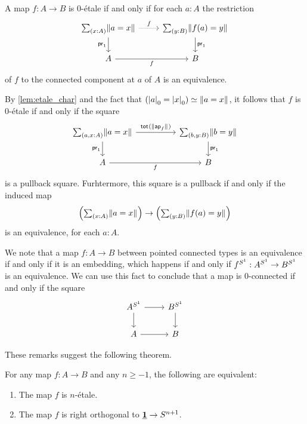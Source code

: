 \documentclass[9pt,twosided]{amsart}
\begin{document}
\begin{rmk}
A map $f:A\to B$ is $0$-\'etale if and only if for each $a:A$ the restriction
\begin{equation*}
\begin{tikzcd}
\sm{x:A}\brck{a=x} \arrow[d,swap,"\proj 1"] \arrow[r,densely dotted,"f"] & \sm{y:B}\brck{f(a)=y} \arrow[d,"\proj 1"] \\
A \arrow[r,swap,"f"] & B
\end{tikzcd}
\end{equation*}
of $f$ to the connected component at $a$ of $A$ is an equivalence.

By \cref{lem:etale_char} and the fact that $\eqv{(\tproj{0}{a}=\tproj{0}{x})}{\brck{a=x}}$, it follows that $f$ is $0$-\'etale if and only if the square
\begin{equation*}
\begin{tikzcd}[column sep=huge]
\sm{a,x:A}\brck{a=x} \arrow[d,swap,"\proj 1"] \arrow[r,"\total{\brck{\apfunc{f}}}"] & \sm{b,y:B}\brck{b=y} \arrow[d,"\proj 1"] \\
A \arrow[r,swap,"f"] & B
\end{tikzcd}
\end{equation*}
is a pullback square. Furhtermore, this square is a pullback if and only if the induced map
\begin{equation*}
\Big(\sm{x:A}\brck{a=x}\Big)\to\Big(\sm{y:B}\brck{f(a)=y}\Big)
\end{equation*}
is an equivalence, for each $a:A$.

We note that a map $f:A\to B$ between pointed connected types is an equivalence if and only if it is an embedding, which happens if and only if $f^{S^{1}}:A^{S^{1}} \to B^{S^{1}}$ is an equivalence. We can use this fact to conclude that a map is $0$-connected if and only if the square
    \begin{equation*}
      \begin{tikzcd}
        A^{\sphere{1}} \arrow[r] \arrow[d] & B^{\sphere{1}} \arrow[d] \\
        A \arrow[r] & B
      \end{tikzcd}
    \end{equation*}
\end{rmk}

These remarks suggest the following theorem.

\begin{thm}
  \label{thm:char_n_etale}
  For any map $f:A\to B$ and any $n\geq -1$, the following are equivalent:
  \begin{enumerate}
  \item The map $f$ is $n$-\'etale.
  \item The map $f$ is right orthogonal to $\underline{\mathbf{1}}\to S^{n+1}$.
  \end{enumerate}
\end{thm}
\end{document}
